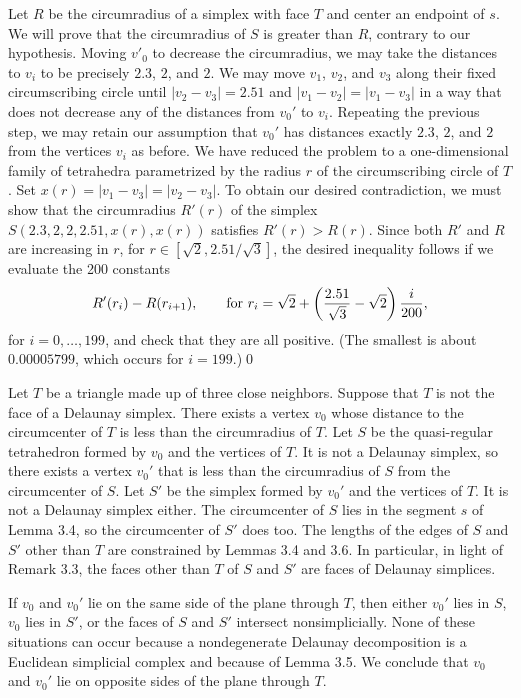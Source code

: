 Let $R$ be the circumradius of a simplex with face $T$
and center an endpoint of $s$.
 We will prove that the circumradius of $S$
is greater than
$R$, contrary to our hypothesis.
Moving $v'_0$ to decrease 
the circumradius,
we may take the distances to $v_i$
to be precisely $2.3$, $2$, and $2$.
We may move $v_1$, $v_2$, and $v_3$ along their fixed circumscribing circle
until $|v_2-v_3|=2.51$ and $|v_1-v_2|=|v_1-v_3|$ in a way
that does not decrease any of the distances from $v_0'$ to $v_i$.
Repeating the previous step, we may retain our assumption that $v_0'$ has
distances exactly $2.3$, $2$, and $2$ from the vertices $v_i$
as before.  We have reduced
the problem to a one-dimensional family of tetrahedra parametrized
by the radius $r$ of the circumscribing circle of $T$.  Set
$x(r) = |v_1-v_3|=|v_2-v_3|$.  To obtain our desired contradiction,
we must show that the circumradius $R'(r)$ of the simplex
$S(2.3,2,2,2.51,x(r),x(r))$ satisfies $R'(r)>R(r)$.  Since
both $R'$ and $R$ are increasing in $r$, for $r\in[\sqrt{2},2.51/\sqrt{3}]$,
the desired inequality follows if we evaluate the 200 constants
$$R'(r_i) - R(r_{i+1}),\qquad \hbox{for } r_i = \sqrt{2} +
                \left({2.51\over\sqrt{3}}-\sqrt{2}\right){i\over 200},$$
for $i=0,\ldots,199$, and check that they are all positive.
(The smallest is about $0.00005799$, which occurs for $i=199$.)\qed

Let $T$ be a triangle made up of three close neighbors.  Suppose
that $T$ is not the face of a Delaunay simplex.  
There exists a vertex $v_0$ whose distance to the circumcenter
of $T$ is less than the circumradius
of $T$.  Let $S$ be the quasi-regular
tetrahedron
formed by $v_0$ and the vertices of $T$.  It is not a Delaunay
simplex, so there exists
a vertex $v_0'$ that is less than the circumradius of $S$ from the
circumcenter of $S$.  Let $S'$ be the simplex formed
by $v_0'$ and the vertices of $T$.  It is not a Delaunay simplex
either.  The circumcenter of $S$ lies in the
segment $s$ of Lemma 3.4, so the circumcenter of $S'$ does too.
The lengths of the edges of $S$ and $S'$ other than $T$ are
constrained by Lemmas 3.4 and 3.6.  In particular, in light
of Remark 3.3, the faces other than $T$ of $S$ and $S'$ are
faces of Delaunay simplices.

If $v_0$ and $v_0'$ lie on the same side of the plane through $T$,
then either $v_0'$ lies in $S$, $v_0$ lies in $S'$, or the faces
of $S$ and $S'$ intersect nonsimplicially.  None of these
situations can occur because a nondegenerate 
Delaunay decomposition is
a Euclidean simplicial complex and because of Lemma 3.5.
We conclude that $v_0$ and $v_0'$ lie on opposite sides of the plane 
through  $T$.

